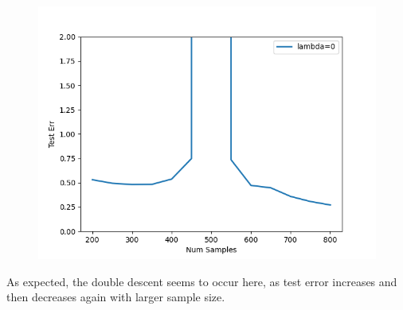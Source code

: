 
\begin{answer}
\begin{figure}[H]
    \centering
    \includegraphics[width = 15cm]{doubledescent/unreg.png}
\end{figure}
As expected, the double descent  seems to occur here, as test error increases and then decreases again with larger sample size. 
\end{answer}
